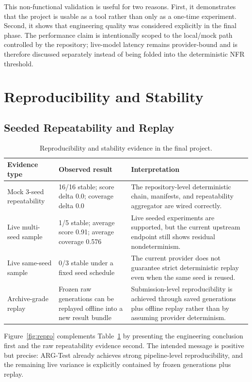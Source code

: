 \documentclass{article}
\begin{document}
This non-functional validation is useful for two reasons. First, it demonstrates that the project is usable as a tool rather than only as a one-time experiment. Second, it shows that engineering quality was considered explicitly in the final phase. The performance claim is intentionally scoped to the local/mock path controlled by the repository; live-model latency remains provider-bound and is therefore discussed separately instead of being folded into the deterministic NFR threshold.

\section{Reproducibility and Stability}
\subsection{Seeded Repeatability and Replay}
\begin{table}[t]
\centering
\small
\caption{Reproducibility and stability evidence in the final project.}
\label{tab:repro}
\begin{tabular}{p{} p{} p{}}
\toprule
\textbf{Evidence type} & \textbf{Observed result} & \textbf{Interpretation} \\
\midrule
Mock 3-seed repeatability & 16/16 stable; score delta 0.0; coverage delta 0.0 & The repository-level deterministic chain, manifests, and repeatability aggregator are wired correctly. \\
Live multi-seed sample & 1/5 stable; average score 0.91; average coverage 0.576 & Live seeded experiments are supported, but the current upstream endpoint still shows residual nondeterminism. \\
Live same-seed sample & 0/3 stable under a fixed seed schedule & The current provider does not guarantee strict deterministic replay even when the same seed is reused. \\
Archive-grade replay & Frozen raw generations can be replayed offline into a new result bundle & Submission-level reproducibility is achieved through saved generations plus offline replay rather than by assuming provider determinism. \\
\bottomrule
\end{tabular}
\end{table}

Figure~\ref{fig:repro} complements Table~\ref{tab:repro} by presenting the engineering conclusion first and the raw repeatability evidence second. The intended message is positive but precise: ARG-Test already achieves strong pipeline-level reproducibility, and the remaining live variance is explicitly contained by frozen generations plus replay.
\end{document}
